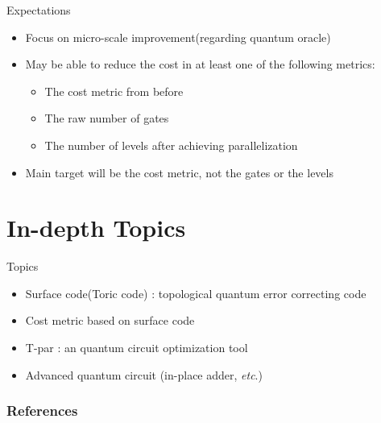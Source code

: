 \documentclass{beamer}
\begin{document}
    \begin{frame}{Expectations}
      \begin{itemize}
        \item Focus on micro-scale improvement(regarding quantum oracle)
        \item May be able to reduce the cost in at least one of the following metrics:
          \begin{itemize}
            \item The cost metric from before
            \item The raw number of gates
            \item The number of levels after achieving parallelization
          \end{itemize}
        \item Main target will be the cost metric, not the gates or the levels
      \end{itemize}
    \end{frame}
    
    \section{In-depth Topics}
    \begin{frame}{Topics}
        \begin{itemize}
            \item Surface code(Toric code) : topological quantum error correcting code
            \item Cost metric based on surface code
            \item T-par \cite{amy2014polynomial} : an quantum circuit optimization tool
            \item Advanced quantum circuit (in-place adder, \textit{etc}.)
        \end{itemize}
    \end{frame}
    
    \begin{frame}[allowframebreaks]
        \frametitle{References}
        
        
    \end{frame}
\end{document}
